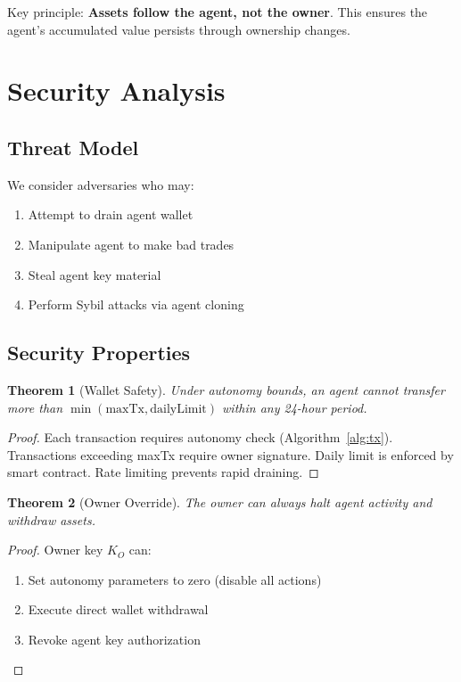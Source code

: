 \documentclass[11pt,letterpaper]{article}
\newtheorem{theorem}{Theorem}[section]
\begin{document}
Key principle: \textbf{Assets follow the agent, not the owner}. This ensures the agent's accumulated value persists through ownership changes.

\section{Security Analysis}
\label{sec:security}

\subsection{Threat Model}

We consider adversaries who may:
\begin{enumerate}
    \item Attempt to drain agent wallet
    \item Manipulate agent to make bad trades
    \item Steal agent key material
    \item Perform Sybil attacks via agent cloning
\end{enumerate}

\subsection{Security Properties}

\begin{theorem}[Wallet Safety]
Under autonomy bounds, an agent cannot transfer more than $\min(\text{maxTx}, \text{dailyLimit})$ within any 24-hour period.
\end{theorem}

\begin{proof}
Each transaction requires autonomy check (Algorithm~\ref{alg:tx}). Transactions exceeding maxTx require owner signature. Daily limit is enforced by smart contract. Rate limiting prevents rapid draining.
\end{proof}

\begin{theorem}[Owner Override]
The owner can always halt agent activity and withdraw assets.
\end{theorem}

\begin{proof}
Owner key $K_O$ can:
\begin{enumerate}
    \item Set autonomy parameters to zero (disable all actions)
    \item Execute direct wallet withdrawal
    \item Revoke agent key authorization
\end{enumerate}
\end{proof}
\end{document}
